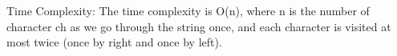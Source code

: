 \documentclass[preview]{standalone}
\begin{document}
Time Complexity: The time complexity is O(n), where n is the number of character ch as we go through the string once, and each character is visited at most twice (once by right and once by left).\\
\end{document}
